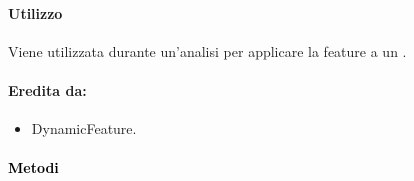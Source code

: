 \paragraph{Utilizzo\\} Viene utilizzata durante un'analisi per applicare la feature\g{} a un \dataset{}.

\paragraph{Eredita da:}
\begin{itemize}
	\item DynamicFeature.
\end{itemize}


\paragraph{\textcolor{black}{Metodi\\}}
